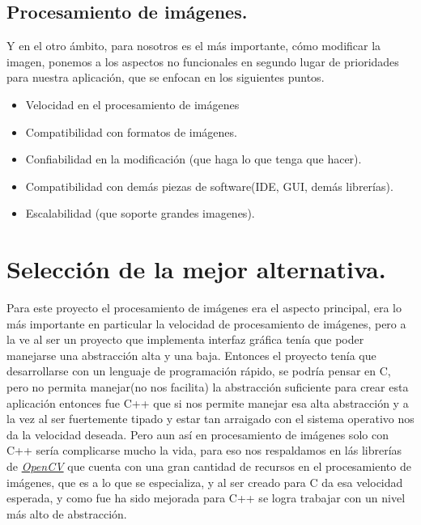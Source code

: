 \documentclass{article}
\begin{document}
\subsection{Procesamiento de imágenes.}
Y en el otro ámbito, para nosotros es el más importante, cómo modificar la imagen, ponemos a los aspectos no funcionales en segundo lugar de prioridades para nuestra aplicación, que se enfocan en los siguientes puntos.
\begin{itemize}
\item Velocidad en el procesamiento de imágenes
\item Compatibilidad con formatos de imágenes.
\item Confiabilidad en la modificación (que haga lo que tenga que hacer).
\item Compatibilidad con demás piezas de software(IDE, GUI, demás librerías).
\item Escalabilidad (que soporte grandes imagenes).
\end{itemize}

\section{Selección de la mejor alternativa.}
Para este proyecto el procesamiento de imágenes era el aspecto principal, era lo más importante en particular la velocidad de procesamiento de imágenes, pero a la ve al ser un proyecto que implementa interfaz gráfica tenía que poder manejarse una abstracción alta y una baja.\newline
Entonces el proyecto tenía que desarrollarse con un lenguaje de programación rápido, se podría pensar en C, pero no permita manejar(no nos facilita) la abstracción suficiente para crear esta aplicación entonces fue C++ que si nos permite manejar esa alta abstracción y a la vez al ser fuertemente tipado y estar tan arraigado con el sistema operativo nos da la velocidad deseada.\newline
Pero aun así en procesamiento de imágenes solo con C++ sería complicarse mucho la vida, para eso nos respaldamos en lás librerías de \href{https://opencv.org}{\textsl{OpenCV}} que cuenta con una gran cantidad de recursos en el procesamiento de imágenes, que es a lo que se especializa, y al ser creado para C da esa velocidad esperada, y como fue ha sido mejorada para C++ se logra trabajar con un nivel más alto de abstracción.
\end{document}
